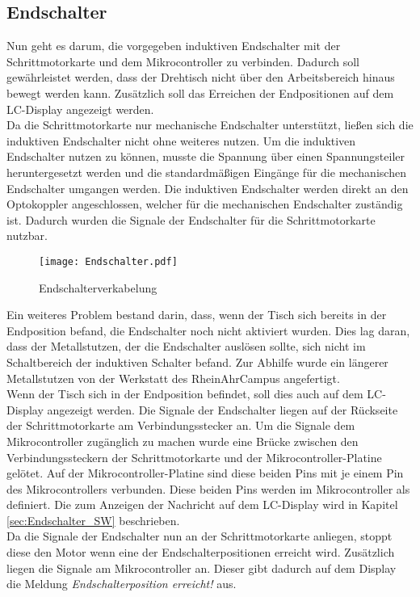 \subsection{Endschalter}
Nun geht es darum, die vorgegeben induktiven Endschalter mit der Schrittmotorkarte und dem Mikrocontroller zu verbinden. Dadurch soll gewährleistet werden, dass der Drehtisch nicht über den Arbeitsbereich hinaus bewegt werden kann. Zusätzlich soll das Erreichen der Endpositionen auf dem LC-Display angezeigt werden.\\
Da die Schrittmotorkarte nur mechanische Endschalter unterstützt, ließen sich die induktiven Endschalter nicht ohne weiteres nutzen. Um die induktiven Endschalter nutzen zu können, musste die Spannung über einen Spannungsteiler heruntergesetzt werden und die standardmäßigen Eingänge für die mechanischen Endschalter umgangen werden. Die induktiven Endschalter werden direkt an den Optokoppler angeschlossen, welcher für die mechanischen Endschalter zuständig ist. Dadurch wurden die Signale der Endschalter für die Schrittmotorkarte nutzbar.
\begin{figure}[h]
\centering
\texttt{[image: Endschalter.pdf]}
\caption{Endschalterverkabelung}
\label{fig:Endschalterverkabelung}
\end{figure}
Ein weiteres Problem bestand darin, dass, wenn der Tisch sich bereits in der Endposition befand, die Endschalter noch nicht aktiviert wurden. Dies lag daran, dass der Metallstutzen, der die Endschalter auslösen sollte, sich nicht im Schaltbereich der induktiven Schalter befand. Zur Abhilfe wurde ein längerer Metallstutzen von der Werkstatt des RheinAhrCampus angefertigt.\\
Wenn der Tisch sich in der Endposition befindet, soll dies auch auf dem LC-Display angezeigt werden. Die Signale der Endschalter liegen auf der Rückseite der Schrittmotorkarte am Verbindungsstecker an. Um die Signale dem Mikrocontroller zugänglich zu machen wurde eine Brücke zwischen den Verbindungssteckern der Schrittmotorkarte und der Mikrocontroller-Platine gelötet. Auf der Mikrocontroller-Platine sind diese beiden Pins mit je einem Pin des Mikrocontrollers verbunden. Diese beiden Pins werden im Mikrocontroller als  definiert. Die  zum Anzeigen der Nachricht auf dem LC-Display wird in Kapitel \ref{sec:Endschalter_SW} beschrieben.\\
Da die Signale der Endschalter nun an der Schrittmotorkarte anliegen, stoppt diese den Motor wenn eine der Endschalterpositionen erreicht wird. Zusätzlich liegen die Signale am Mikrocontroller an. Dieser gibt dadurch auf dem Display die Meldung \emph{Endschalterposition erreicht!} aus.


